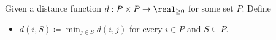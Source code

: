 Given a distance function $d : P \times P \to \real_{\geq 0}$ for some set $P$. Define
\begin{itemize}
    \item $d(i,S) \coloneqq \min_{j \in S} d(i,j)$ for every $i \in P$ and $S \subseteq P$.
\end{itemize}




